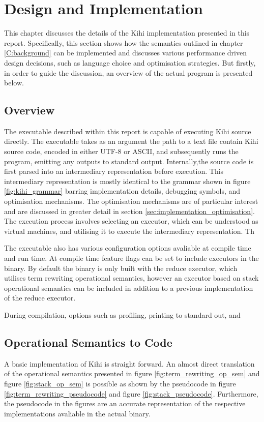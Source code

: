 \chapter{Design and Implementation} \label{C:implementation} 
This chapter discusses the details of the Kihi implementation presented in this report. Specifically, this section shows how the semantics outlined in chapter \ref{C:background} can be implemented and discusses various performance driven design decisions, such as language choice and optimisation strategies. But firstly, in order to guide the discussion, an overview of the actual program is presented below.

\section{Overview}
The executable described within this report is capable of executing Kihi source directly. The executable takes as an argument the path to a text file contain Kihi source code, encoded in either UTF-8 or ASCII, and subsequently runs the program, emitting any outputs to standard output. Internally,the source code is first parsed into an intermediary representation before execution. This     intermediary representation is mostly identical to the grammar shown in figure \ref{fig:kihi_grammar} barring implementation details, debugging symbols, and optimisation mechanisms. The optimisation mechanisms are of particular interest and are discussed in greater detail in section \ref{sec:implementation_optimisation}. The execution process involves selecting an executor, which can be understood as virtual machines, and utilising it to execute the intermediary representation. Th

The executable also has various configuration options avaliable at compile time and run time. At compile time feature flags can be set to include executors in the binary. By default the binary is only built with the reduce executor, which utilises term rewriting operational semantics, however an executor based on stack operational semantics can be included in addition to a previous implementation of the reduce executor.

During compilation, options such as profiling, printing to standard out, and 

\section{Operational Semantics to Code}
A basic implementation of Kihi is straight forward. An almost direct translation of the operational semantics presented in figure \ref{fig:term_rewriting_op_sem} and figure \ref{fig:stack_op_sem} is possible as shown by the pseudocode in figure \ref{fig:term_rewriting_pseudocode} and figure \ref{fig:stack_pseudocode}. Furthermore, the pseudocode in the figures are an accurate representation of the respective implementations avaliable in the actual binary.



